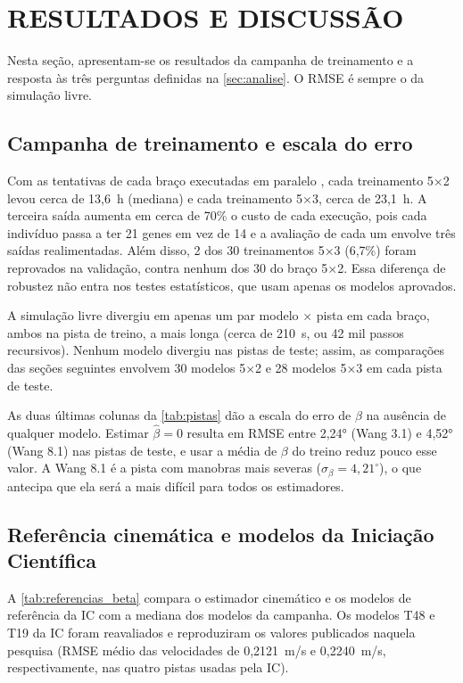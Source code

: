 \chapter{RESULTADOS E DISCUSSÃO}\label{sec:resultados}

Nesta seção, apresentam-se os resultados da campanha de treinamento e a resposta às três perguntas definidas na \autoref{sec:analise}. O RMSE é sempre o da simulação livre.

\section{Campanha de treinamento e escala do erro}\label{sec:campanha}

Com as tentativas de cada braço executadas em paralelo , cada treinamento 5×2 levou cerca de 13,6~h (mediana) e cada treinamento 5×3, cerca de 23,1~h. A terceira saída aumenta em cerca de 70\% o custo de cada execução, pois cada indivíduo passa a ter 21 genes em vez de 14 e a avaliação de cada um envolve três saídas realimentadas. Além disso, 2 dos 30 treinamentos 5×3 (6,7\%) foram reprovados na validação, contra nenhum dos 30 do braço 5×2. Essa diferença de robustez não entra nos testes estatísticos, que usam apenas os modelos aprovados.

A simulação livre divergiu em apenas um par modelo × pista em cada braço, ambos na pista de treino, a mais longa (cerca de 210~s, ou 42 mil passos recursivos). Nenhum modelo divergiu nas pistas de teste; assim, as comparações das seções seguintes envolvem 30 modelos 5×2 e 28 modelos 5×3 em cada pista de teste.

As duas últimas colunas da \autoref{tab:pistas} dão a escala do erro de $\beta$ na ausência de qualquer modelo. Estimar $\hat\beta = 0$ resulta em RMSE entre 2,24° (Wang 3.1) e 4,52° (Wang 8.1) nas pistas de teste, e usar a média de $\beta$ do treino reduz pouco esse valor. A Wang 8.1 é a pista com manobras mais severas ($\sigma_\beta = 4{,}21^\circ$), o que antecipa que ela será a mais difícil para todos os estimadores.

\section{Referência cinemática e modelos da Iniciação Científica}\label{sec:referencias}

A \autoref{tab:referencias_beta} compara o estimador cinemático e os modelos de referência da IC com a mediana dos modelos da campanha. Os modelos T48 e T19 da IC foram reavaliados e reproduziram os valores publicados naquela pesquisa (RMSE médio das velocidades de 0,2121~m/s e 0,2240~m/s, respectivamente, nas quatro pistas usadas pela IC).

